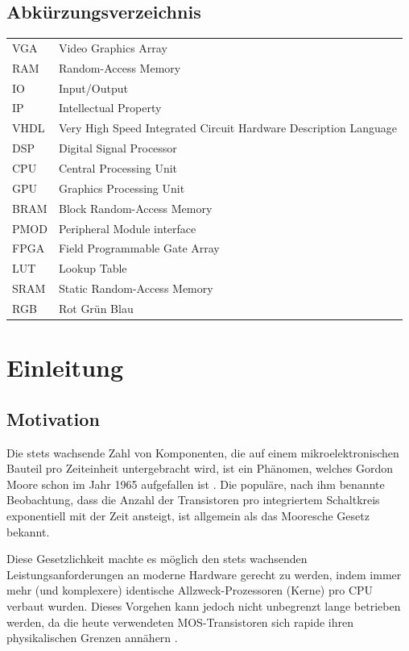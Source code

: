\documentclass[a4paper,12pt,onesided]{report}
\begin{document}
\section*{Abkürzungsverzeichnis}
\begin{tabular}{ll}
  VGA & Video Graphics Array \\
  RAM & Random-Access Memory \\
  IO & Input/Output \\
  IP & Intellectual Property \\
  VHDL & Very High Speed Integrated Circuit Hardware Description Language \\
  DSP & Digital Signal Processor \\
  CPU & Central Processing Unit \\
  GPU & Graphics Processing Unit \\
  BRAM & Block Random-Access Memory \\
  PMOD & Peripheral Module interface \\
  FPGA & Field Programmable Gate Array \\
  LUT & Lookup Table \\
  SRAM & Static Random-Access Memory \\
  RGB & Rot Grün Blau \\
\end{tabular}

\newpage
\chapter{Einleitung}
\section{Motivation}
Die stets wachsende Zahl von Komponenten, die auf einem mikroelektronischen Bauteil pro Zeiteinheit untergebracht wird, ist ein Phänomen, welches Gordon Moore schon im Jahr 1965 aufgefallen ist \cite{moore1965cramming}. Die populäre, nach ihm benannte Beobachtung, dass die Anzahl der Transistoren pro integriertem Schaltkreis exponentiell mit der Zeit ansteigt, ist allgemein als das Mooresche Gesetz bekannt.

Diese Gesetzlichkeit machte es möglich den stets wachsenden Leistungsanforderungen an moderne Hardware gerecht zu werden, indem immer mehr (und komplexere) identische Allzweck-Prozessoren (Kerne) pro CPU verbaut wurden.
Dieses Vorgehen kann jedoch nicht unbegrenzt lange betrieben werden, da die heute verwendeten MOS-Transistoren sich rapide ihren physikalischen Grenzen annähern \cite{MOSScaling}.
\end{document}
